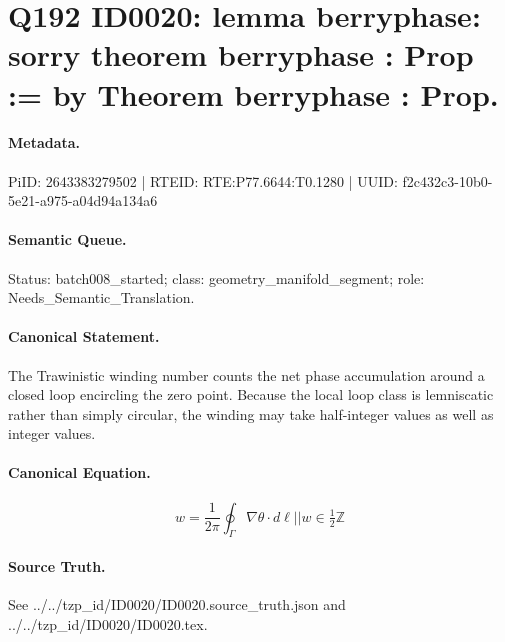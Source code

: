 \section*{Q192 ID0020: lemma berryphase: sorry theorem berryphase : Prop := by Theorem berryphase : Prop.}
\paragraph{Metadata.}
PiID: 2643383279502 | RTEID: RTE:P77.6644:T0.1280 | UUID: f2c432c3-10b0-5e21-a975-a04d94a134a6

\paragraph{Semantic Queue.}
Status: batch008\_started; class: geometry\_manifold\_segment; role: Needs\_Semantic\_Translation.

\paragraph{Canonical Statement.}
The Trawinistic winding number counts the net phase accumulation around a closed loop encircling the zero point. Because the local loop class is lemniscatic rather than simply circular, the winding may take half-integer values as well as integer values.

\paragraph{Canonical Equation.}
\[
w = \frac{1}{2\pi} \oint_{\Gamma} \nabla \theta \cdot d\ell || w \in \tfrac{1}{2}\mathbb{Z}
\]

\paragraph{Source Truth.}
See ../../tzp\_id/ID0020/ID0020.source\_truth.json and ../../tzp\_id/ID0020/ID0020.tex.
